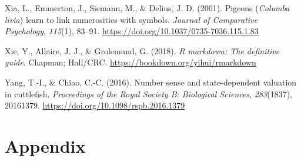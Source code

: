 \documentclass[
  ,pub,floatsintext]{apa6}
\newlength{\cslhangindent}
\newlength{\cslentryspacingunit} %
\newenvironment{CSLReferences}[2] %
 {%
  \setlength{\parindent}{0pt}
  \ifodd #1
  \let\oldpar\par
  \def\par{\hangindent=\cslhangindent\oldpar}
  \fi
  \setlength{\parskip}{#2\cslentryspacingunit}
 }%
 {}
\begin{document}
\begin{CSLReferences}{1}{0}
\leavevmode{}%
Xia, L., Emmerton, J., Siemann, M., \& Delius, J. D. (2001). Pigeons (\emph{{Columba} livia}) learn to link numerosities with symbols. \emph{Journal of Comparative Psychology}, \emph{115}(1), 83--91. \url{https://doi.org/10.1037/0735-7036.115.1.83}

\leavevmode{}%
Xie, Y., Allaire, J. J., \& Grolemund, G. (2018). \emph{R markdown: The definitive guide}. Chapman; Hall/CRC. \url{https://bookdown.org/yihui/rmarkdown}

\leavevmode{}%
Yang, T.-I., \& Chiao, C.-C. (2016). Number sense and state-dependent valuation in cuttlefish. \emph{Proceedings of the Royal Society B: Biological Sciences}, \emph{283}(1837), 20161379. \url{https://doi.org/10.1098/rspb.2016.1379}

\end{CSLReferences}

\hypertarget{appendix}{%
\section{Appendix}\label{appendix}}

\singlespacing
\renewcommand{\thetable}{A\arabic{table}}
\setcounter{table}{0}
\renewcommand{\thefigure}{A\arabic{figure}}
\setcounter{figure}{0}
\end{document}
